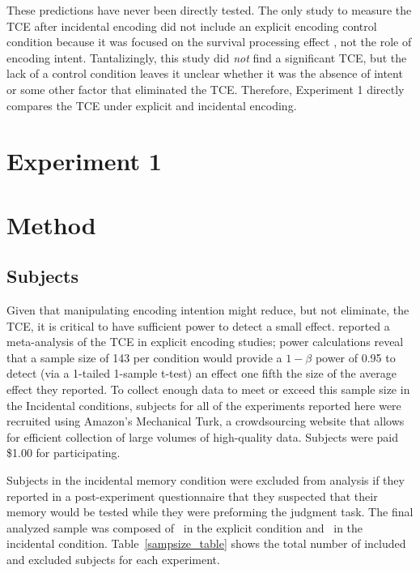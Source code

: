 \documentclass[jou,natbib]{apa6} %
\begin{document}
These predictions have never been directly tested. The only study to measure the TCE after incidental encoding \citep{NairEtal16} did not include an explicit encoding control condition because it was focused on the survival processing effect \citep{NairPand16}, not the role of encoding intent. Tantalizingly, this study did \emph{not} find a significant TCE, but the lack of a control condition leaves it unclear whether it was the absence of intent or some other factor that eliminated the TCE. Therefore, Experiment 1 directly compares the TCE under explicit and incidental encoding. 

\section{Experiment 1}

\section{Method}

\newcommand\listlength{16} %
\newcommand\presrate{4 seconds} %
\newcommand\isi{1 second} %
\newcommand\DFRDelay{16 seconds} %
\newcommand\recalltime{75 seconds} %
\newcommand\totalss{XX}
\newcommand\totalexcluded{XX}

\subsection{Subjects}

Given that manipulating encoding intention might reduce, but not eliminate, the TCE, it is critical to have sufficient power to detect a small effect. \citet{SedeEtal10} reported a meta-analysis of the TCE in explicit encoding studies; power calculations reveal that a sample size of 143 per condition would provide a $1-\beta$ power of 0.95 to detect (via a 1-tailed 1-sample t-test) an effect one fifth the size of the average effect they reported. 
To collect enough data to meet or exceed this sample size in the Incidental conditions, subjects for all of the experiments reported here were recruited using Amazon's Mechanical Turk, a crowdsourcing website that allows for efficient collection of large volumes of high-quality data. Subjects were paid \$1.00 for participating.

Subjects in the incidental memory condition were excluded from analysis if they reported in a post-experiment questionnaire that they suspected that their memory would be tested while they were preforming the judgment task. The final analyzed sample was composed of \shoeExplicitIncluded~in the explicit condition and \shoeIncidentalIncluded~in the incidental condition. Table~\ref{sampsize_table} shows the total number of included and excluded subjects for each experiment.
 
\end{document}
